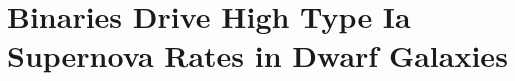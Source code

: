 \documentclass[../main.tex]{subfiles}
\begin{document}
\chapter{Binaries Drive High Type Ia Supernova Rates in Dwarf Galaxies}
\label{iarates}






\end{document}
